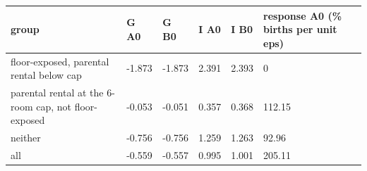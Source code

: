 \begingroup\small
\setlength{\tabcolsep}{3pt}
\renewcommand{\arraystretch}{1.04}
\begin{tabularx}{\linewidth}{XXXXXX}
\toprule
group & G A0 & G B0 & I A0 & I B0 & response A0 (\% births per unit eps) \\
\midrule
floor-exposed, parental rental below cap & -1.873 & -1.873 & 2.391 & 2.393 & 0 \\
parental rental at the 6-room cap, not floor-exposed & -0.053 & -0.051 & 0.357 & 0.368 & 112.15 \\
neither & -0.756 & -0.756 & 1.259 & 1.263 & 92.96 \\
all & -0.559 & -0.557 & 0.995 & 1.001 & 205.11 \\
\bottomrule
\end{tabularx}
\endgroup
